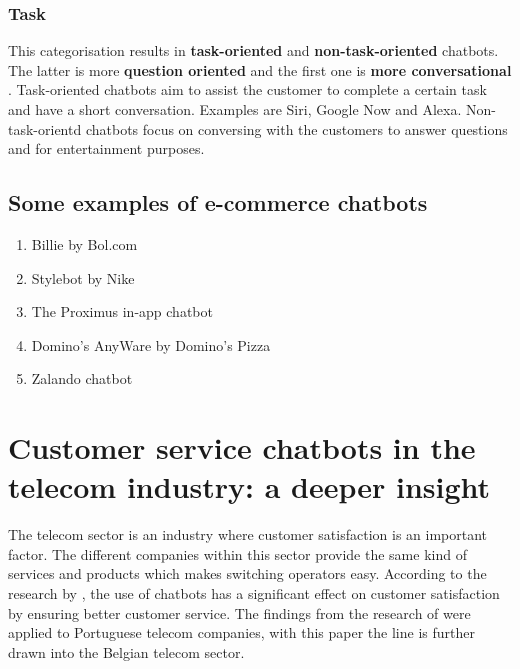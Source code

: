 \subsubsection{Task}
This categorisation results in \textbf{task-oriented} and \textbf{non-task-oriented} chatbots. The latter is more \textbf{question oriented} and the first one is \textbf{more conversational} \citep{Nuruzzaman2018}. Task-oriented chatbots aim to assist the customer to complete a certain task and have a short conversation. Examples are Siri, Google Now and Alexa. Non-task-orientd chatbots focus on conversing with the customers to answer questions and for entertainment purposes. \citep{Nuruzzaman2018}\\

\subsection{Some examples of e-commerce chatbots}
\begin{enumerate}
	\item Billie by Bol.com
	\item Stylebot by Nike
	\item The Proximus in-app chatbot
	\item Domino's AnyWare by Domino's Pizza
	\item Zalando chatbot
\end{enumerate}

\section{Customer service chatbots in the telecom industry: a deeper insight}
The telecom sector is an industry where customer satisfaction is an important factor. The different companies within this sector provide the same kind of services and products which makes switching operators easy. According to the research by \citep{Quintino2019}, the use of chatbots has a significant effect on customer satisfaction by ensuring better customer service. The findings from the research of \citeauthor{Quintino1019} were applied to Portuguese telecom companies, with this paper the line is further drawn into the Belgian telecom sector.\\
